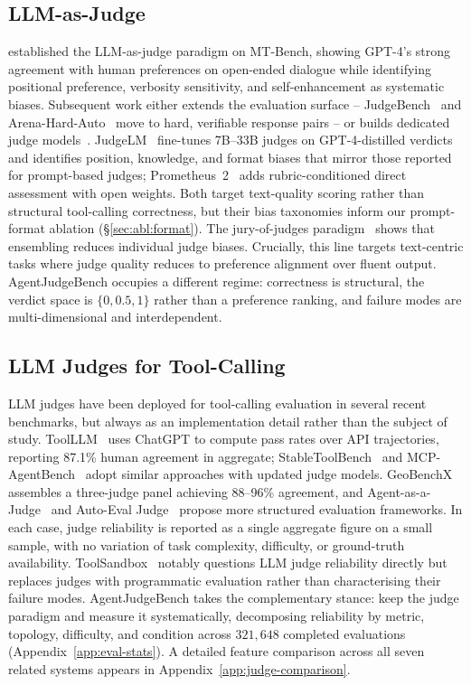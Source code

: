 \subsection{LLM-as-Judge}
\citet{zheng2023judging} established the LLM-as-judge paradigm on MT-Bench, showing GPT-4's strong agreement with human preferences on open-ended dialogue while identifying positional preference, verbosity sensitivity, and self-enhancement as systematic biases. Subsequent work either extends the evaluation surface -- JudgeBench~\citep{tan2025judgebench} and Arena-Hard-Auto~\citep{li2024arenahard} move to hard, verifiable response pairs -- or builds dedicated judge models~\citep{wang2024pandalm,li2024autoj,zhu2023judgelm,kim2024prometheus2}. JudgeLM~\citep{zhu2023judgelm} fine-tunes 7B--33B judges on GPT-4-distilled verdicts and identifies position, knowledge, and format biases that mirror those reported for prompt-based judges; Prometheus~2~\citep{kim2024prometheus2} adds rubric-conditioned direct assessment with open weights. Both target text-quality scoring rather than structural tool-calling correctness, but their bias taxonomies inform our prompt-format ablation (\S\ref{sec:abl:format}). The jury-of-judges paradigm~\citep{verga2024jury} shows that ensembling reduces individual judge biases. Crucially, this line targets text-centric tasks where judge quality reduces to preference alignment over fluent output. AgentJudgeBench occupies a different regime: correctness is structural, the verdict space is $\{0, 0.5, 1\}$ rather than a preference ranking, and failure modes are multi-dimensional and interdependent.

\subsection{LLM Judges for Tool-Calling}
LLM judges have been deployed for tool-calling evaluation in several recent benchmarks, but always as an implementation detail rather than the subject of study. ToolLLM~\citep{qin2024toolllm} uses ChatGPT to compute pass rates over API trajectories, reporting 87.1\% human agreement in aggregate; StableToolBench~\citep{guo2024stabletoolbench} and MCP-AgentBench~\citep{guo2025mcpagentbench} adopt similar approaches with updated judge models. GeoBenchX~\citep{krechetova2025geobenchx} assembles a three-judge panel achieving 88--96\% agreement, and Agent-as-a-Judge~\citep{zhuge2024agentjudge} and Auto-Eval Judge~\citep{bhonsle2025autoeval} propose more structured evaluation frameworks. In each case, judge reliability is reported as a single aggregate figure on a small sample, with no variation of task complexity, difficulty, or ground-truth availability. ToolSandbox~\citep{lu2024toolsandbox} notably questions LLM judge reliability directly but replaces judges with programmatic evaluation rather than characterising their failure modes. AgentJudgeBench takes the complementary stance: keep the judge paradigm and measure it systematically, decomposing reliability by metric, topology, difficulty, and condition across $321{,}648$ completed evaluations (Appendix~\ref{app:eval-stats}). A detailed feature comparison across all seven related systems appears in Appendix~\ref{app:judge-comparison}.
